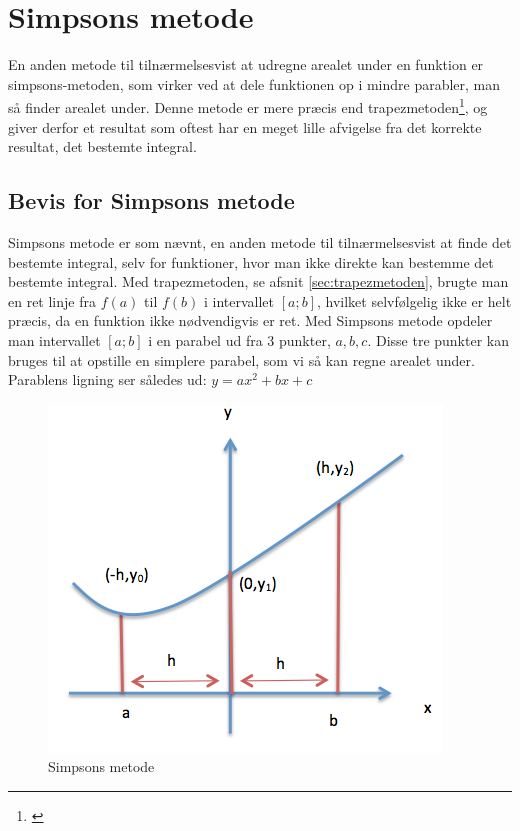 \documentclass[12pt]{article}
\numberwithin{equation}{section}
\begin{document}
\section{Simpsons metode}
En anden metode til tilnærmelsesvist at udregne arealet under en funktion er simpsons-metoden, som virker ved at dele funktionen op i mindre parabler, man så finder arealet under. Denne metode er mere præcis end trapezmetoden\footnote{\cite[side 15]{2012matA}}, og giver derfor et resultat som oftest har en meget lille afvigelse fra det korrekte resultat, det bestemte integral.
\subsection{Bevis for Simpsons metode}
Simpsons metode er som nævnt, en anden metode til tilnærmelsesvist at finde det bestemte integral, selv for funktioner, hvor man ikke direkte kan bestemme det bestemte integral. Med trapezmetoden, se afsnit \ref{sec:trapezmetoden}, brugte man en ret linje fra $f(a)$ til $f(b)$ i intervallet $[a;b]$, hvilket selvfølgelig ikke er helt præcis, da en funktion ikke nødvendigvis er ret. Med Simpsons metode opdeler man intervallet $[a;b]$ i en parabel ud fra 3 punkter, $a,b,c$. Disse tre punkter kan bruges til at opstille en simplere parabel, som vi så kan regne arealet under. Parablens ligning ser således ud: $y=ax^2+bx+c$
\begin{figure}[H]
\centering
\includegraphics[width=0.6\linewidth]{Billeder/Simpsonsmetode}
\caption{Simpsons metode}
\label{fig:simpsonsmetode}
\end{figure}
\end{document}
